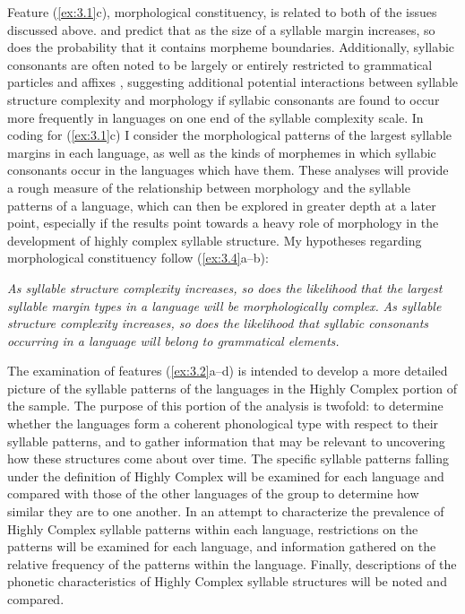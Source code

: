   Feature (\ref{ex:3.1}c), morphological constituency, is related to both of the issues discussed above. \citet[250]{Greenberg19651978} and \citet{DresslerDziubalska-Kołaczyk2006} predict that as the size of a syllable margin increases, so does the probability that it contains morpheme boundaries. Additionally, syllabic consonants are often noted to be largely or entirely restricted to grammatical particles and affixes \citep[159]{Bell1978a}, suggesting additional potential interactions between syllable structure complexity and morphology if syllabic consonants are found to occur more frequently in languages on one end of the syllable complexity scale. In coding for (\ref{ex:3.1}c) I consider the morphological patterns of the largest syllable margins in each language, as well as the kinds of morphemes in which syllabic consonants occur in the languages which have them. These analyses will provide a rough measure of the relationship between morphology and the syllable patterns of a language, which can then be explored in greater depth at a later point, especially if the results point towards a heavy role of morphology in the development of highly complex syllable structure. My hypotheses regarding morphological constituency follow (\ref{ex:3.4}a--b):

\ea\label{ex:3.4}
\ea  \textit{As syllable structure complexity increases, so does the likelihood that the largest syllable margin types in a language will be morphologically complex.} 
\ex  \textit{As syllable structure complexity increases, so does the likelihood that syllabic consonants occurring in a language will belong to grammatical elements.}
\z
\z

  The examination of features (\ref{ex:3.2}a--d) is intended to develop a more detailed picture of the syllable patterns of the languages in the Highly Complex portion of the sample. The purpose of this portion of the analysis is twofold: to determine whether the languages form a coherent phonological type with respect to their syllable patterns, and to gather information that may be relevant to uncovering how these structures come about over time. The specific syllable patterns falling under the definition of Highly Complex will be examined for each language and compared with those of the other languages of the group to determine how similar they are to one another. In an attempt to characterize the prevalence of Highly Complex syllable patterns within each language, restrictions on the patterns will be examined for each language, and information gathered on the relative frequency of the patterns within the language. Finally, descriptions of the phonetic characteristics of Highly Complex syllable structures will be noted and compared.


